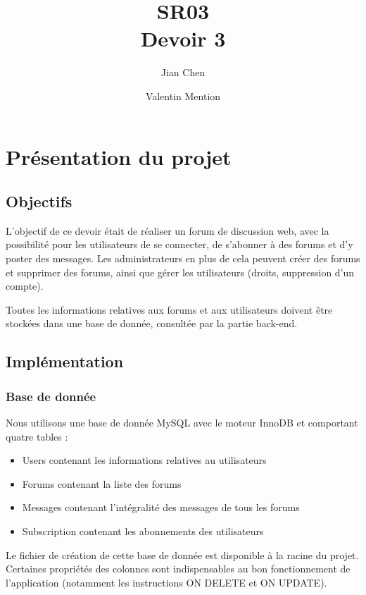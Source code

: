 \documentclass[10pt,a4paper]{article}
\author{
	Jian Chen
	\and
	Valentin Mention
}
\title{SR03\\
	Devoir 3}
\begin{document}
	\maketitle
	\newpage
	
	\tableofcontents
	\newpage
	
	\section{Présentation du projet}
	
	\subsection{Objectifs}
	
	L'objectif de ce devoir était de réaliser un forum de discussion web, avec la possibilité pour les utilisateurs de se connecter, de s'abonner à des forums et d'y poster des messages. Les administrateurs en plus de cela peuvent créer des forums et supprimer des forums, ainsi que gérer les utilisateurs (droits, suppression d'un compte).
	
	Toutes les informations relatives aux forums et aux utilisateurs doivent être stockées dans une base de donnée, consultée par la partie back-end.
	
	\subsection{Implémentation} 
	
	\subsubsection{Base de donnée}
	
	Nous utilisons une base de donnée MySQL avec le moteur InnoDB et  comportant quatre tables :
	
	\begin{itemize}
		\item Users contenant les informations relatives au utilisateurs
		\item Forums contenant la liste des forums
		\item Messages contenant l'intégralité des messages de tous les forums
		\item Subscription contenant les abonnements des utilisateurs
	\end{itemize}
	
	\bigskip

	Le fichier de création de cette base de donnée est disponible à la racine du projet. Certaines propriétés des colonnes sont indispensables au bon fonctionnement de l'application (notamment les instructions ON DELETE et ON UPDATE).
	
\end{document}
